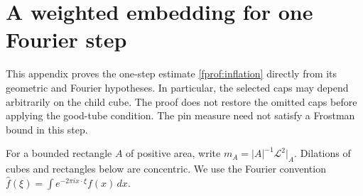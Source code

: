 \clearpage
\section{A weighted embedding for one Fourier step}
\label{uf:embedding}

This appendix proves the one-step estimate
\eqref{fprof:inflation} directly from its geometric and Fourier hypotheses.
In particular, the selected caps may depend arbitrarily on the child cube.
The proof does not restore the omitted caps before applying the good-tube
condition. The pin measure need not satisfy a Frostman bound in this step.

For a bounded rectangle \(A\) of positive area, write
\(m_A=|A|^{-1}\mathcal L^2|_A\). Dilations of cubes and rectangles below
are concentric. We use the Fourier convention
\(\widehat f(\xi)=\int e^{-2\pi i x\cdot\xi}f(x)\,dx\).

